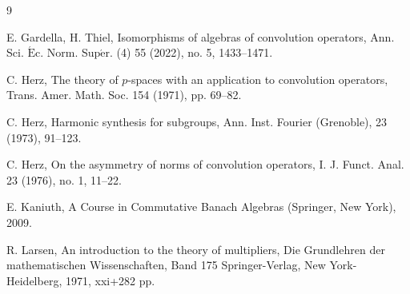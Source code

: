 \documentclass[reqno,11pt]{amsart}
\theoremstyle{plain}
\theoremstyle{definition}
\theoremstyle{remark}
\begin{document}
\begin{thebibliography}{9}

E. Gardella, H. Thiel, Isomorphisms of algebras of convolution operators, Ann. Sci. $\acute{\mathrm{E}}$c. Norm. Sup$\acute{\mathrm{e}}$r. (4) 55 (2022), no. 5, 1433--1471.


C. Herz, The theory of $p$-spaces with an application to convolution operators,
Trans. Amer. Math. Soc. 154 (1971), pp. 69--82.

C. Herz, Harmonic synthesis for subgroups, Ann. Inst. Fourier (Grenoble), 23
(1973), 91--123.

C. Herz, On the asymmetry of norms of convolution operators, I. J. Funct. Anal. 23 (1976), no. 1, 11--22.

%
       E. Kaniuth, A Course in Commutative Banach Algebras (Springer, New York), 2009.

%


R. Larsen, An introduction to the theory of multipliers, Die Grundlehren der mathematischen Wissenschaften, Band 175
Springer-Verlag, New York-Heidelberg, 1971, xxi+282 pp.




%




\end{thebibliography}
\end{document}
